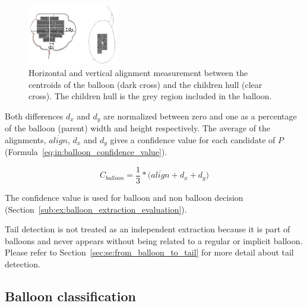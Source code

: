     \begin{figure}[ht]%
      \centering
      \includegraphics[trim= 0px 15px 80px 24px, clip, width=0.35\textwidth]{coaxial_alignment.png}
    \caption[Balloon content alignment measures]{Horizontal and vertical alignment measurement between the centroids of the balloon (dark cross) and the children hull (clear cross). The children hull is the grey region included in the balloon.}
    \label{fig:in:coaxial_alignment}
    \end{figure}

Both differences $d_x$ and $d_y$ are normalized between zero and one as a percentage of the balloon (parent) width and height respectively.
The average of the alignments, $\overline{align}$, $d_x$ and $d_y$ gives a confidence value for each candidate of $P$ (Formula~\ref{eq:in:balloon_confidence_value}).

\begin{equation}
	\label{eq:in:balloon_confidence_value}
	C_{balloon} = \frac{1}{3} * \Big( \overline{align} + d_x + d_y \Big)
\end{equation}

The confidence value is used for balloon and non balloon decision (Section~\ref{sub:ex:balloon_extraction_evaluation}).


Tail detection is not treated as an independent extraction because it is part of balloons and never appears without being related to a regular or implicit balloon.
Please refer to Section~\ref{sec:se:from_balloon_to_tail} for more detail about tail detection.

\subsection{Balloon classification} %
\label{sub:in:balloon_classification}

